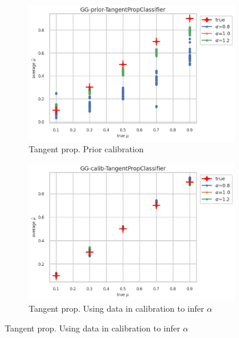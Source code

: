 \begin{figure}[ht!]
  \begin{subfigure}[t]{0.49\linewidth}
    \includegraphics[width=\linewidth]{COMPARE/GG-prior/TangentPropClassifier/profusion_true_mu_target_mean.png}
    \caption{Tangent prop. Prior calibration}
  \end{subfigure}%
  \hfill
  \begin{subfigure}[t]{0.49\linewidth}
    \includegraphics[width=\linewidth]{COMPARE/GG-calib/TangentPropClassifier/profusion_true_mu_target_mean.png}
    \caption{Tangent prop. Using data in calibration to infer $\alpha$}
  \end{subfigure}


\end{figure}
